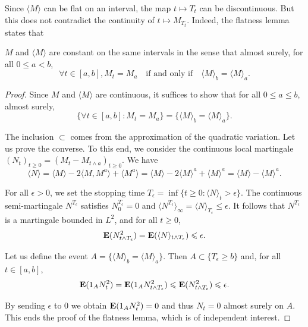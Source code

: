 Since \( \langle M \rangle \) can be flat on an interval, the map \( t \mapsto T_t \) can be discontinuous. But this does not contradict the continuity of \( t \mapsto M_{T_t} \). Indeed, the flatness lemma states that 
\begin{lemma}
    \( M \) and \( \langle M \rangle \) are constant on the same intervals in the sense that almost surely, for all \( 0 \leq a < b \),
    \[
        \forall t \in [a, b], M_t = M_a \quad \text{if and only if} \quad \langle M \rangle_b = \langle M \rangle_a.
    \]
\end{lemma}
\begin{proof}
    Since \( M \) and \( \langle M \rangle \) are continuous, it suffices to show that for all \( 0 \leq a \leq b \), almost surely,
\[
\{\forall t \in [a, b] : M_t = M_a\} = \{\langle M \rangle_b = \langle M \rangle_a\}.
\]

The inclusion \( \subset \) comes from the approximation of the quadratic variation. Let us prove the converse. To this end, we consider the continuous local martingale \( (N_t)_{t \geq 0} = (M_t - M_{t \wedge a})_{t \geq 0} \). We have
\[
\langle N \rangle = \langle M \rangle - 2 \langle M, M^a \rangle + \langle M^a \rangle = \langle M \rangle - 2 \langle M \rangle^a + \langle M \rangle^a = \langle M \rangle - \langle M \rangle^a.
\]

For all \( \epsilon > 0 \), we set the stopping time \( T_\epsilon = \inf\{t \geq 0 : \langle N \rangle_t > \epsilon\} \). The continuous semi-martingale \( N^{T_\epsilon} \) satisfies \( N_0^{T_\epsilon} = 0 \) and \( \langle N^{T_\epsilon} \rangle_\infty = \langle N \rangle_{T_\epsilon} \leq \epsilon \). It follows that \( N^{T_\epsilon} \) is a martingale bounded in \( L^2 \), and for all \( t \geq 0 \),
\[
{\mathbf E} (N_{t \wedge T_\epsilon}^2) = {\mathbf E} (\langle N \rangle_{t \wedge T_\epsilon}) \leqslant \epsilon.
\]

Let us define the event \( A = \{\langle M \rangle_b = \langle M \rangle_a\} \). Then \( A \subset \{T_\epsilon \geq b\} \) and, for all \( t \in [a, b] \),
\[
{\mathbf E} (1_A N_t^2) = {\mathbf E} (1_A N_{t \wedge T_\epsilon}^2) \leqslant {\mathbf E} (N_{t \wedge T_\epsilon}^2) \leqslant \epsilon.
\]

By sending \( \epsilon \) to 0 we obtain \( {\mathbf E} (1_A N_t^2) = 0 \) and thus \( N_t = 0 \) almost surely on \( A \). This ends the proof of the flatness lemma, which is of independent interest.
\end{proof}

